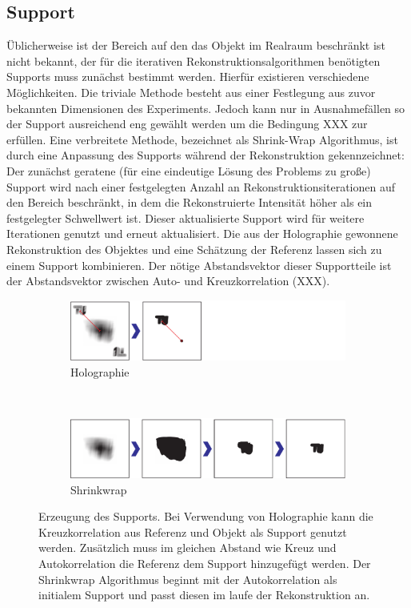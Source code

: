 \subsection{Support}
Üblicherweise ist der Bereich auf den das Objekt im Realraum beschränkt ist nicht bekannt, der für die iterativen Rekonstruktionsalgorithmen benötigten Supports muss zunächst bestimmt werden. Hierfür existieren verschiedene Möglichkeiten. Die triviale Methode besteht aus einer Festlegung aus zuvor bekannten Dimensionen des Experiments. Jedoch kann nur in Ausnahmefällen so der Support ausreichend eng gewählt werden um die Bedingung XXX zur erfüllen.
Eine verbreitete Methode, bezeichnet als Shrink-Wrap Algorithmus, ist durch eine Anpassung des Supports während der Rekonstruktion gekennzeichnet: Der zunächst geratene (für eine eindeutige Lösung des Problems  zu große) Support wird nach einer festgelegten Anzahl an Rekonstruktionsiterationen auf den Bereich beschränkt, in dem die Rekonstruierte Intensität höher als ein festgelegter Schwellwert ist. Dieser aktualisierte Support wird für weitere Iterationen genutzt und erneut aktualisiert\cite{marchesini2003}.
Die aus der Holographie gewonnene Rekonstruktion des Objektes und eine Schätzung der Referenz lassen sich zu einem Support kombinieren. Der nötige Abstandsvektor dieser Supportteile ist der Abstandsvektor zwischen Auto- und Kreuzkorrelation (XXX).

\begin{figure}
	\centering
	\begin{subfigure}[b]{0.9\textwidth}
		\includegraphics[width=\textwidth]{images/support_holo.pdf}
		\caption{Holographie}
	\end{subfigure}\\

	\begin{subfigure}[b]{0.9\textwidth}
		\includegraphics[width=\textwidth]{images/support_sw.pdf}
		\caption{Shrinkwrap}	
	\end{subfigure}
	
	\caption[Supportgenerierung]{Erzeugung des Supports. Bei Verwendung von Holographie kann die Kreuzkorrelation aus Referenz und Objekt als Support genutzt werden. Zusätzlich muss im gleichen Abstand wie Kreuz und Autokorrelation die Referenz dem Support hinzugefügt werden. Der Shrinkwrap Algorithmus beginnt mit der Autokorrelation als initialem Support und passt diesen im laufe der Rekonstruktion an.}
	\label{fig:support}
\end{figure} 

